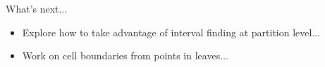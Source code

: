 \documentclass{beamer}
\begin{document}


\begin{frame}{What's next...}
  \begin{itemize}
    \item Explore how to take advantage of interval finding at partition level...
    \item Work on cell boundaries from points in leaves...
  \end{itemize}
\end{frame}
\end{document}
